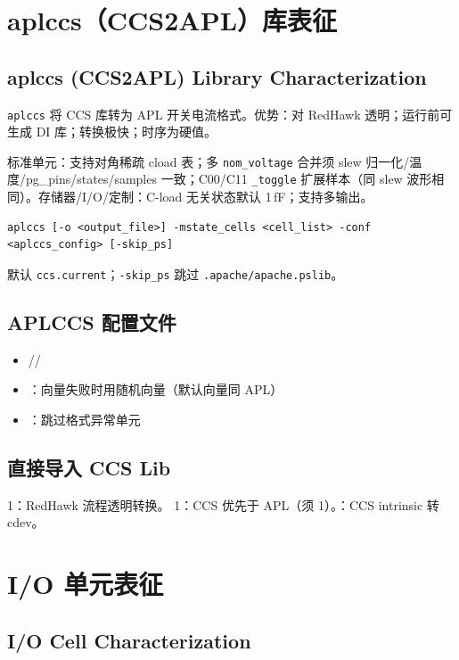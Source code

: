 \section{aplccs（CCS2APL）库表征}
\subsection*{aplccs (CCS2APL) Library Characterization}

\texttt{aplccs} 将 CCS 库转为 APL 开关电流格式。优势：对 RedHawk 透明；运行前可生成 DI 库；转换极快；时序为硬值。

标准单元：支持对角稀疏 cload 表；多 \texttt{nom\_voltage} 合并须 slew 归一化/温度/pg\_pins/states/samples 一致；C00/C11 \texttt{\_toggle} 扩展样本（同 slew 波形相同）。存储器/I/O/定制：C-load 无关状态默认 1\,fF；支持多输出。

\begin{lstlisting}
aplccs [-o <output_file>] -mstate_cells <cell_list> -conf <aplccs_config> [-skip_ps]
\end{lstlisting}
默认 \texttt{ccs.current}；\texttt{-skip\_ps} 跳过 \texttt{.apache/apache.pslib}。

\subsection{APLCCS 配置文件}
\begin{itemize}
  \item {}//
  \item {}：向量失败时用随机向量（默认向量同 APL）
  \item {}：跳过格式异常单元
\end{itemize}

\subsection{直接导入 CCS Lib}
 1：RedHawk 流程透明转换。 1：CCS 优先于 APL（须  1）。：CCS intrinsic 转 cdev。

\section{I/O 单元表征}
\subsection*{I/O Cell Characterization}

